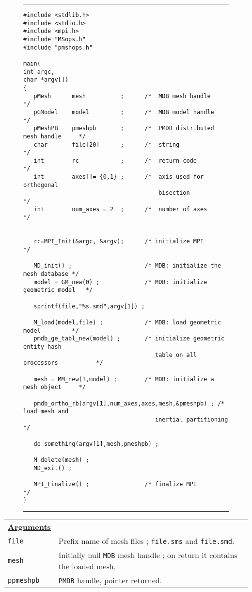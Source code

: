 \pagestyle{empty}
\appendix
{}
{\newpage
\clearpage
\samepage \begin{figure}\noindent \rule{5.9in}{0.01in} \noindent
 

\begin{verbatim}#include <stdlib.h>
#include <stdio.h>
#include <mpi.h>
#include "MSops.h"
#include "pmshops.h"

main(
int argc,
char *argv[])
{
   pMesh      mesh          ;      /*  MDB mesh handle                  */
   pGModel    model         ;      /*  MDB model handle                 */
   pMeshPB    pmeshpb       ;      /*  PMDB distributed mesh handle     */
   char       file[20]      ;      /*  string                           */
   int        rc            ;      /*  return code                      */
   int        axes[]= {0,1} ;      /*  axis used for orthogonal 
                                       bisection                        */
   int        num_axes = 2  ;      /*  number of axes                   */
   

   rc=MPI_Init(&argc, &argv);      /* initialize MPI                    */

   MD_init() ;                     /* MDB: initialize the mesh database */
   model = GM_new(0) ;             /* MDB: initialize geometric model   */

   sprintf(file,"%s.smd",argv[1]) ;

   M_load(model,file) ;            /* MDB: load geometric model         */
   pmdb_ge_tabl_new(model) ;       /* initialize geometric entity hash
                                      table on all processors           */

   mesh = MM_new(1,model) ;        /* MDB: initialize a mesh object     */
   
   pmdb_ortho_rb(argv[1],num_axes,axes,mesh,&pmeshpb) ; /* load mesh and 
                                      inertial partitioning             */

   do_something(argv[1],mesh,pmeshpb) ; 

   M_delete(mesh) ; 
   MD_exit() ; 

   MPI_Finalize() ;                /* finalize MPI                      */
}
\end{verbatim}

\noindent \rule{5.9in}{0.01in} \noindent
 
\label{lab_man_ex1}
\end{figure}
}

{\newpage
\clearpage
\samepage \begin{tabular}%
{p{1.0in}p{4.9in}}
{\bf \underline{Arguments}} & \\  

\verb$file$     & Prefix name of mesh files ;
                  \verb$file.sms$ and \verb$file.smd$. \\  
\verb$mesh$     & Initially null {\tt MDB}  mesh handle ;  on return it
                   contains the loaded mesh. \\  
\verb$ppmeshpb$ & {\tt PMDB} handle, pointer returned.

\end{tabular}
}

